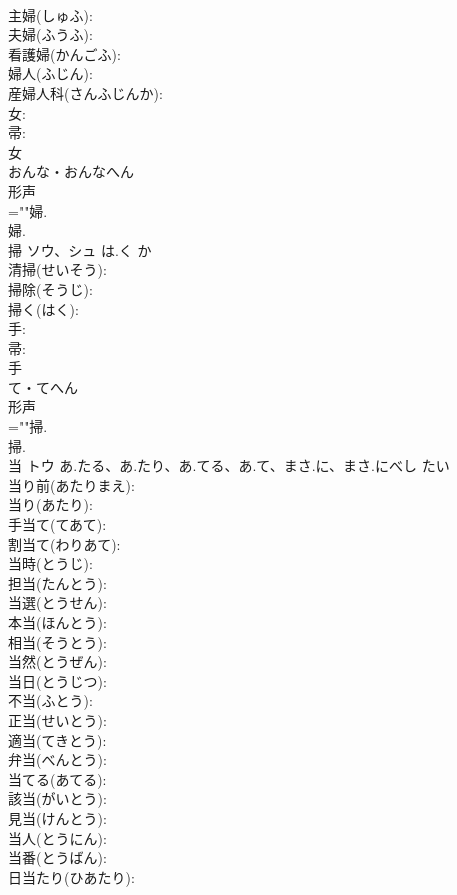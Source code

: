 \documentclass[8pt]{extreport}
\begin{document}
\begin{CJK}{UTF8}{min}
\\	主婦(しゅふ): 
\\	夫婦(ふうふ): 
\\	看護婦(かんごふ): 
\\	婦人(ふじん): 
\\	産婦人科(さんふじんか): 
\\	女: 
\\	帚: 
\\	女	
\\	おんな・おんなへん	
\\	形声 
\\	=""婦.
\\	婦.
\\	掃	ソウ、シュ	は.く	か	
\\	清掃(せいそう): 
\\	掃除(そうじ): 
\\	掃く(はく): 
\\	手: 
\\	帚: 
\\	手	
\\	て・てへん	
\\	形声 
\\	=""掃.
\\	掃.
\\	当	トウ	あ.たる、あ.たり、あ.てる、あ.て、まさ.に、まさ.にべし	たい	
\\	当り前(あたりまえ): 
\\	当り(あたり): 
\\	手当て(てあて): 
\\	割当て(わりあて): 
\\	当時(とうじ): 
\\	担当(たんとう): 
\\	当選(とうせん): 
\\	本当(ほんとう): 
\\	相当(そうとう): 
\\	当然(とうぜん): 
\\	当日(とうじつ): 
\\	不当(ふとう): 
\\	正当(せいとう): 
\\	適当(てきとう): 
\\	弁当(べんとう): 
\\	当てる(あてる): 
\\	該当(がいとう): 
\\	見当(けんとう): 
\\	当人(とうにん): 
\\	当番(とうばん): 
\\	日当たり(ひあたり): 

\end{CJK}
\end{document}
